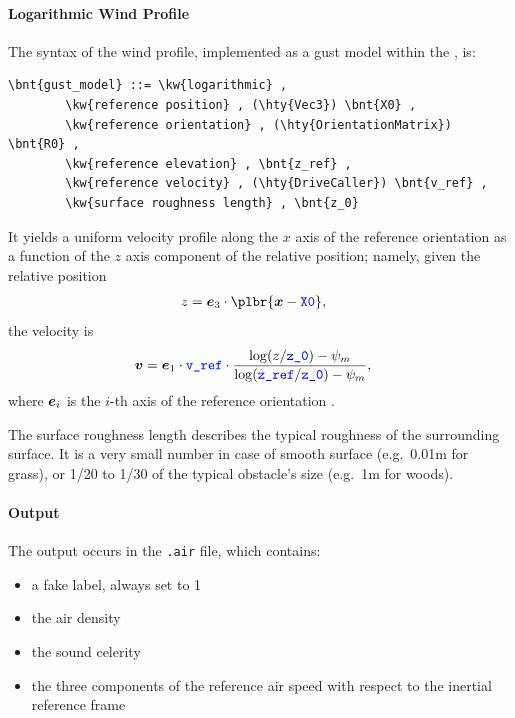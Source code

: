 \paragraph{Logarithmic Wind Profile}
The syntax of the  wind profile, implemented as a gust model
within the , is:
\begin{Verbatim}[commandchars=\\\{\}]
    \bnt{gust_model} ::= \kw{logarithmic} ,
        \kw{reference position} , (\hty{Vec3}) \bnt{X0} ,
        \kw{reference orientation} , (\hty{OrientationMatrix}) \bnt{R0} ,
        \kw{reference elevation} , \bnt{z_ref} ,
        \kw{reference velocity} , (\hty{DriveCaller}) \bnt{v_ref} ,
        \kw{surface roughness length} , \bnt{z_0}
\end{Verbatim}
It yields a uniform velocity profile along the $x$ axis of the
reference orientation as a function of the $z$ axis component
of the relative position; namely, given the relative position
\begin{align}
	z &= \T{e}_3 \cdot \plbr{\T{x} - \nt{X0}}
	,
\end{align}
the velocity is
\begin{align}
	\boldsymbol{v}
	&=
	\boldsymbol{e}_1 \cdot \textcolor{blue}{\texttt{v\_ref}} \cdot \frac{
		\log(z/\textcolor{blue}{\texttt{z\_0}}) - \psi_m
	}{
		\log(\textcolor{blue}{\texttt{z\_ref}}/\textcolor{blue}{\texttt{z\_0}}) - \psi_m
	}
	,
\end{align}
where $\boldsymbol{e}_i$ is the $i$-th axis of the reference orientation .

The surface roughness length describes the typical roughness
of the surrounding surface.
It is a very small number in case of smooth surface
(e.g.\ 0.01m for grass),
or 1/20 to 1/30 of the typical obstacle's size (e.g.\ 1m for woods).


\paragraph{Output}
The output occurs in the \texttt{.air} file, which contains:
\begin{itemize}
\item a fake label, always set to 1
\item the air density
\item the sound celerity
\item the three components of the reference air speed
with respect to the inertial reference frame
\end{itemize}


